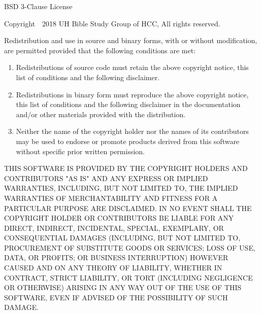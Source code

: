 \documentclass[Chinese,inNight]{CKBib}
\begin{document}
\begin{footnotesize}

\noindent BSD 3-Clause License

\vspace{1em}

\noindent Copyright~\textcopyright~2018 UH Bible Study Group of HCC, All rights reserved.

\vspace{1em}

\noindent Redistribution and use in source and binary forms, with or without modification, are permitted provided that the following conditions are met:

\begin{enumerate}
  \item Redistributions of source code must retain the above copyright notice, this list of conditions and the following disclaimer.
  \item Redistributions in binary form must reproduce the above copyright notice, this list of conditions and the following disclaimer in the documentation and/or other materials provided with the distribution.
  \item Neither the name of the copyright holder nor the names of its contributors may be used to endorse or promote products derived from this software without specific prior written permission.
\end{enumerate}

\noindent THIS SOFTWARE IS PROVIDED BY THE COPYRIGHT HOLDERS AND CONTRIBUTORS "AS IS" AND ANY EXPRESS OR IMPLIED WARRANTIES, INCLUDING, BUT NOT LIMITED TO, THE IMPLIED WARRANTIES OF MERCHANTABILITY AND FITNESS FOR A PARTICULAR PURPOSE ARE DISCLAIMED. IN NO EVENT SHALL THE COPYRIGHT HOLDER OR CONTRIBUTORS BE LIABLE FOR ANY DIRECT, INDIRECT, INCIDENTAL, SPECIAL, EXEMPLARY, OR CONSEQUENTIAL DAMAGES (INCLUDING, BUT NOT LIMITED TO, PROCUREMENT OF SUBSTITUTE GOODS OR SERVICES; LOSS OF USE, DATA, OR PROFITS; OR BUSINESS INTERRUPTION) HOWEVER CAUSED AND ON ANY THEORY OF LIABILITY, WHETHER IN CONTRACT, STRICT LIABILITY, OR TORT (INCLUDING NEGLIGENCE OR OTHERWISE) ARISING IN ANY WAY OUT OF THE USE OF THIS SOFTWARE, EVEN IF ADVISED OF THE POSSIBILITY OF SUCH DAMAGE.

\end{footnotesize}

\cleardoublepage

\thispagestyle{empty}
\pagestyle{empty}

\renewcommand{\contentsname}{\chapFont 目录}
\tableofcontents*
\end{document}
